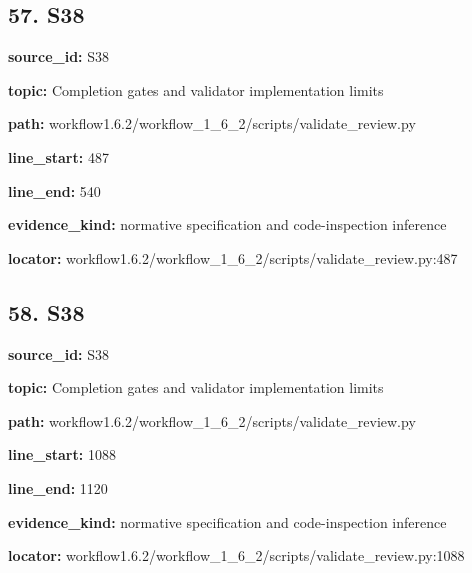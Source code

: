 \documentclass[10pt,a4paper]{article}
\begin{document}
\subsection*{57.\allowbreak{} S38}
\textbf{source\_\allowbreak{}id:} S38\par
\textbf{topic:} Completion gates and validator implementation limits\par
\textbf{path:} workflow1.\allowbreak{}6.\allowbreak{}2/\allowbreak{}workflow\_\allowbreak{}1\_\allowbreak{}6\_\allowbreak{}2/\allowbreak{}scripts/\allowbreak{}validate\_\allowbreak{}review.\allowbreak{}py\par
\textbf{line\_\allowbreak{}start:} 487\par
\textbf{line\_\allowbreak{}end:} 540\par
\textbf{evidence\_\allowbreak{}kind:} normative specification and code-\allowbreak{}inspection inference\par
\textbf{locator:} workflow1.\allowbreak{}6.\allowbreak{}2/\allowbreak{}workflow\_\allowbreak{}1\_\allowbreak{}6\_\allowbreak{}2/\allowbreak{}scripts/\allowbreak{}validate\_\allowbreak{}review.\allowbreak{}py:487\par
\subsection*{58.\allowbreak{} S38}
\textbf{source\_\allowbreak{}id:} S38\par
\textbf{topic:} Completion gates and validator implementation limits\par
\textbf{path:} workflow1.\allowbreak{}6.\allowbreak{}2/\allowbreak{}workflow\_\allowbreak{}1\_\allowbreak{}6\_\allowbreak{}2/\allowbreak{}scripts/\allowbreak{}validate\_\allowbreak{}review.\allowbreak{}py\par
\textbf{line\_\allowbreak{}start:} 1088\par
\textbf{line\_\allowbreak{}end:} 1120\par
\textbf{evidence\_\allowbreak{}kind:} normative specification and code-\allowbreak{}inspection inference\par
\textbf{locator:} workflow1.\allowbreak{}6.\allowbreak{}2/\allowbreak{}workflow\_\allowbreak{}1\_\allowbreak{}6\_\allowbreak{}2/\allowbreak{}scripts/\allowbreak{}validate\_\allowbreak{}review.\allowbreak{}py:1088\par
\end{document}
